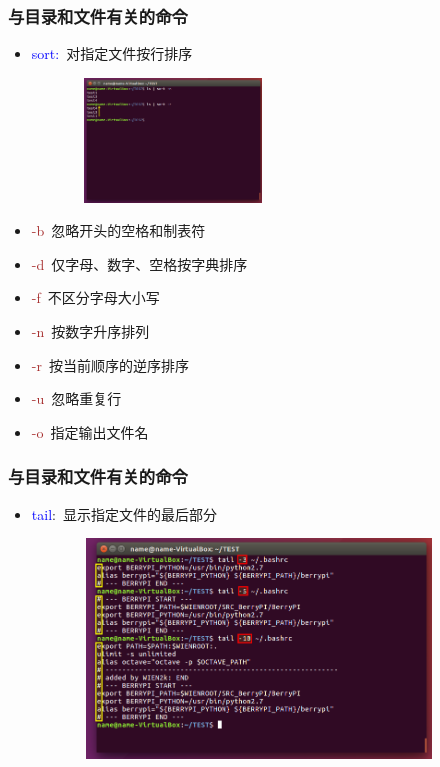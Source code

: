 \frame
{
	\frametitle{与目录和文件有关的命令}
\begin{minipage}{0.48\textwidth}
\begin{itemize}
	\item \textcolor{blue}{sort:}~对指定文件按行排序
\begin{figure}[h!]
\centering
\hspace*{-28.5pt}
\vspace{18.5pt}
\includegraphics[height=1.3in,width=2.1in,viewport=0 350 400 600,clip]{Figures/Ubuntu-sort.png}
\label{Linux-command-sort}
\end{figure}
	\end{itemize}
\end{minipage}
\begin{minipage}{0.50\textwidth}
	\begin{itemize}
		\item \textcolor{brown}{-b}~忽略开头的空格和制表符
		\item \textcolor{brown}{-d}~仅字母、数字、空格按字典排序
		\item \textcolor{brown}{-f}~不区分字母大小写
		\item \textcolor{brown}{-n}~按数字升序排列
		\item \textcolor{brown}{-r}~按当前顺序的逆序排序
		\item \textcolor{brown}{-u}~忽略重复行
		\item \textcolor{brown}{-o}~指定输出文件名
	\end{itemize}
\end{minipage}
}

\frame
{
	\frametitle{与目录和文件有关的命令}
	\begin{itemize}
		\item \textcolor{blue}{tail}:~显示指定文件的最后部分
\begin{figure}[h!]
\centering
\vspace{-12.5pt}
\includegraphics[height=2.3in,width=3.9in,viewport=0 0 800 480,clip]{Figures/Ubuntu-tail.png}
\label{Linux-command-tail}
\end{figure}
	\end{itemize}
}

